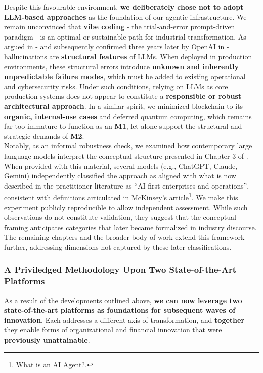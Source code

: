 \documentclass{article}
\begin{document}
Despite this favourable environment, \textbf{we deliberately chose not to adopt LLM-based approaches} as the foundation of our agentic infrastructure. We remain unconvinced that \textbf{vibe coding} - the trial-and-error prompt-driven paradigm - is an optimal or sustainable path for industrial transformation. As argued in \cite{Digital Washing} - and subsequently confirmed three years later by OpenAI in \cite{Why_Hallucinate} - hallucinations are \textbf{structural features} of LLMs. When deployed in production environments, these structural errors introduce \textbf{unknown and inherently unpredictable failure modes}, which must be added to existing operational and cybersecurity risks. Under such conditions, relying on LLMs as core production systems does not appear to constitute a \textbf{responsible or robust architectural approach}. In a similar spirit, we minimized blockchain to its \textbf{organic, internal-use cases} and deferred quantum computing, which remains far too immature to function as an \textbf{M1}, let alone support the structural and strategic demands of \textbf{M2}.\\

Notably, as an informal robustness check, we examined how contemporary large language models interpret the conceptual structure presented in Chapter 3 of \cite{Data MAPs}. When provided with this material, several models (e.g., ChatGPT, Claude, Gemini) independently classified the approach as aligned with what is now described in the practitioner literature as “AI-first enterprises and operations”, consistent with definitions articulated in McKinsey's article\footnote{\href{https://www.mckinsey.com/featured-insights/mckinsey-explainers/what-is-an-ai-agent.}{What is an AI Agent?.}}. We make this experiment publicly reproducible to allow independent assessment. While such observations do not constitute validation, they suggest that the conceptual framing anticipates categories that later became formalized in industry discourse. The remaining chapters and the broader body of work extend this framework further, addressing dimensions not captured by these later classifications.\\



\subsubsection{A Priviledged Methodology Upon Two State-of-the-Art Platforms}
\label{subsubsection: A Priviledged Methodology Upon Two State-of-the-Art Platforms}
As a result of the developments outlined above, \textbf{we can now leverage two state-of-the-art platforms as foundations for subsequent waves of innovation}. Each addresses a different axis of transformation, and \textbf{together} they enable forms of organizational and financial innovation that were \textbf{previously unattainable}.\\
\end{document}
